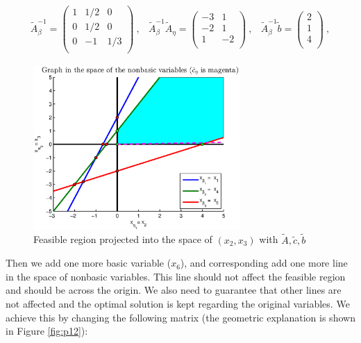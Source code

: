 \[
\begin{array}{ccc}
\tilde{A}_\beta^{-1}  =  \left(
  \begin{array}{ccc}
    1 & 1/2 & 0   \\
    0 & 1/2 & 0 \\
    0 & -1 & 1/3\\
  \end{array}
\right)~, &

\tilde{A}_\beta^{-1}\tilde{A}_\eta  =  \left(
  \begin{array}{cc}
    -3 & 1   \\
    -2 & 1 \\
    1 & -2\\
  \end{array}
\right)~,&

\tilde{A}_\beta^{-1}\tilde{b}  =  \left(
  \begin{array}{c}
    2   \\
    1 \\
    4\\
  \end{array}
\right)~,

\end{array}
\]

\begin{figure}[h!!]
\includegraphics[width=0.7\textwidth]{p2/initial.eps}
\caption{Feasible region projected into the space of $(x_2,x_3)$ with $\tilde{A},\tilde{c},\tilde{b}$}\label{fig:p11}
\end{figure}

Then we add one more basic variable ($x_6$), and corresponding add one more line in the space of nonbasic variables. This line should not affect the feasible region and should be across the origin. We also need to guarantee that other lines are not affected and the optimal solution is kept regarding the original variables. We achieve this by changing the following matrix (the geometric explanation is shown in Figure \ref{fig:p12}):

